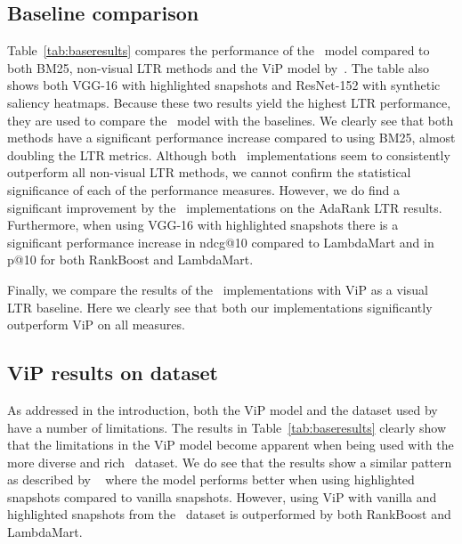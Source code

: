 \subsection{Baseline comparison}
Table~\ref{tab:baseresults} compares the performance of the \modelname~model compared to both BM25, non-visual \ac{LTR} methods and the ViP model by~\citet{fan2017learning}. 
The table also shows both VGG-16 with highlighted snapshots and ResNet-152 with synthetic saliency heatmaps. Because these two results yield the highest \ac{LTR} performance, they are used to compare the \modelname~model with the baselines. 
We clearly see that both methods have a significant performance increase compared to using BM25, almost doubling the \ac{LTR} metrics.
Although both \modelname~implementations seem to consistently outperform all non-visual \ac{LTR} methods, we cannot confirm the statistical significance of each of the performance measures. 
However, we do find a significant improvement by the \modelname~implementations on the AdaRank \ac{LTR} results. Furthermore, when using VGG-16 with highlighted snapshots there is a significant performance increase in ndcg@10 compared to LambdaMart and in p@10 for both RankBoost and LambdaMart.

Finally, we compare the results of the \modelname~implementations with ViP as a visual \ac{LTR} baseline. 
Here we clearly see that both our implementations significantly outperform ViP on all measures. 

\subsection{ViP results on \datasetname dataset}
As addressed in the introduction, both the ViP model and the dataset used by~\citet{fan2017learning} have a number of limitations. The results in Table~\ref{tab:baseresults} clearly show that the limitations in the ViP model become apparent when being used with the more diverse and rich \datasetname~dataset. We do see that the results show a similar pattern as described by ~\citet{fan2017learning} where the model performs better when using highlighted snapshots compared to vanilla snapshots. However, using ViP with vanilla and highlighted snapshots from the \datasetname~dataset is outperformed by both RankBoost and LambdaMart. 

